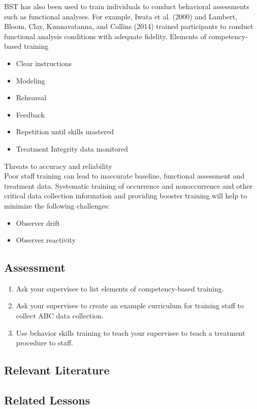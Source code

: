 BST has also been used to train individuals to conduct behavioral assessments such as functional analyses. For example, Iwata et al. (2000) and Lambert, Bloom, Clay, Kunnavatanna, and Collins (2014) trained participants to conduct functional analysis conditions with adequate fidelity. 
%
Elements of competency-based training
\begin{itemize}
\item Clear instructions
\item Modeling
\item Rehearsal
\item Feedback 
\item Repetition until skills mastered
\item Treatment Integrity data monitored
\end{itemize}
%
Threats to accuracy and reliability\\
Poor staff training can lead to inaccurate baseline, functional assessment and treatment data.  Systematic training of occurrence and nonoccurrence and other critical data collection information and providing booster training will help to minimize the following challenges:
\begin{itemize}
\item Observer drift
\item Observer reactivity
\end{itemize}
%
\subsection{Assessment}
\begin{enumerate}
\item Ask your supervisee to list elements of competency-based training. 
\item Ask your supervisee to create an example curriculum for training staff to collect ABC data collection.
\item Use behavior skills training to teach your supervisee to teach a treatment procedure to staff. 
%
\end{enumerate}
%
\subsection{Relevant Literature}
\begin{refsection}
\nocite{cooper2007applied,
        iwata2000skill,
        lambert2014training,
        miles2009effects,
        parsons1995training,
        sarokoff2004effects,
        shore1995pyramidal}
\printbibliography[heading=none]
\end{refsection} 
%
\subsection{Related Lessons}
\fourdFour{}\\
\fourdFive{}\\
\foureThree{}\\
\fourfThree{}\\
\fourkTwo{}\\
